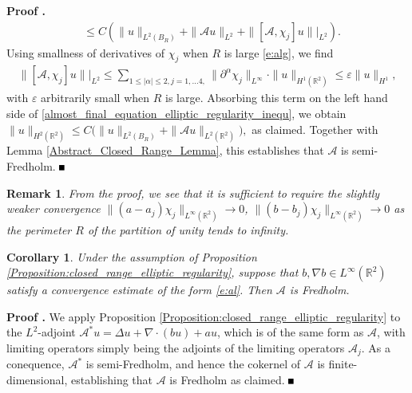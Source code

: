 \documentclass[10pt]{article}
\newtheorem{Corollary}[Lemma]{Corollary}
\newtheorem{Remark}[Lemma]{Remark}
\newenvironment{Proof}[1][\unskip]%
 {\begin{trivlist} \item[]{\bf Proof #1. }}%
 {\hspace*{\fill}$\rule{.4\baselineskip}{.4\baselineskip}$\end{trivlist}}
\newcommand{\R}{\mathbb{R}}
\renewcommand{\leq}{\leqslant}
\begin{document}
\begin{Proof}
\begin{align}
& \leq C\left( \| u\|_{L^2(B_R)} + \|\mathcal{A}u \|_{L^2}  +\|[\mathcal{A}, \chi_j]u\||_{L^2}\right).
\end{align}
Using smallness of derivatives of $\chi_j$ when $R$ is large \eqref{e:alg}, we find 
\begin{align*}
\|[\mathcal{A}, \chi_j]u\||_{L^2} \leq \sum_{1\leq |\alpha |\leq 2, j =1,\ldots 4,} \|\partial^{\alpha }\chi_j\|_{L^{\infty}}\cdot\|u\|_{H^1(\mathbb{R}^2)} \leq \varepsilon \|u\|_{H^1},  
\end{align*}
with $\varepsilon$ arbitrarily small when $R$ is large. Absorbing this term on the left hand side of \eqref{almost_final_equation_elliptic_regularity_inequ}, we obtain  $\displaystyle{\|u \|_{H^2(\mathbb{R}^2)}  \leq C( \| u\|_{L^2(B_R)} + \|\mathcal{A}u \|_{L^2(\mathbb{R}^2)}}),$ as claimed. Together with Lemma \ref{Abstract_Closed_Range_Lemma}, this establishes that $\mathcal{A}$ is semi-Fredholm. 
\end{Proof}
\begin{Remark}
From the proof, we see that it is sufficient to require the slightly weaker convergence $\|(a-a_j)\chi_j\|_{L^\infty(\R^2)}\to 0$, $\|(b-b_j)\chi_j\|_{L^\infty(\R^2)}\to 0$  as the perimeter $R$ of the partition of unity tends to infinity.
\end{Remark}
\begin{Corollary}\label{c:1}
Under the assumption of Proposition \ref{Proposition:closed_range_elliptic_regularity}, suppose that $b,\nabla b\in L^\infty(\R^2)$ satisfy a convergence estimate of the form \eqref{e:al}. Then $\mathcal{A}$ is Fredholm. 
\end{Corollary}
\begin{Proof}
We apply Proposition \ref{Proposition:closed_range_elliptic_regularity} to the $L^2$-adjoint $\mathcal{A}^*u=\Delta u + \nabla\cdot(b u)+au$, which is of the same form as $\mathcal{A}$, with limiting operators simply being the adjoints of the limiting operators $\mathcal{A}_j$. As a conequence, $\mathcal{A}^*$ is semi-Fredholm, and hence the cokernel of $\mathcal{A}$ is finite-dimensional, establishing that $\mathcal{A}$ is Fredholm as claimed. 
\end{Proof}

% 
\end{document}
